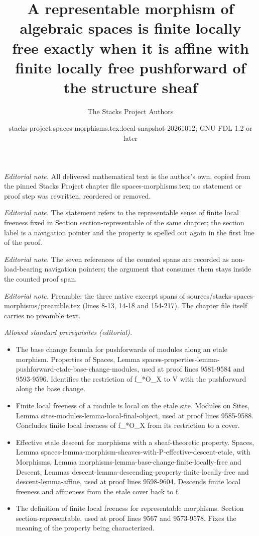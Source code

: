 \documentclass[10pt,a4paper]{amsart}
\title{A representable morphism of algebraic spaces is finite locally free exactly when it is affine with finite locally free pushforward of the structure sheaf}
\author{The Stacks Project Authors}
\date{stacks-project:spaces-morphisms.tex:local-snapshot-20261012; GNU FDL 1.2 or later}
\theoremstyle{plain}
\theoremstyle{definition}
\theoremstyle{remark}
\numberwithin{equation}{subsection}
\begin{document}
\maketitle
\setcounter{subsection}{1}
\noindent\textit{Editorial note.} All delivered mathematical text is the author's own, copied from the pinned Stacks Project chapter file spaces-morphisms.tex; no statement or proof step was rewritten, reordered or removed.\par\medskip
\noindent\textit{Editorial note.} The statement refers to the representable sense of finite local freeness fixed in Section section-representable of the same chapter; the section label is a navigation pointer and the property is spelled out again in the first line of the proof.\par\medskip
\noindent\textit{Editorial note.} The seven references of the counted spans are recorded as non-load-bearing navigation pointers; the argument that consumes them stays inside the counted proof span.\par\medskip
\noindent\textit{Editorial note.} Preamble: the three native excerpt spans of sources/stacks-spaces-morphisms/preamble.tex (lines 8-13, 14-18 and 154-217). The chapter file itself carries no preamble text.\par\medskip
\noindent\textit{Allowed standard prerequisites (editorial).}\begin{itemize}
\item The base change formula for pushforwards of modules along an etale morphism. Properties of Spaces, Lemma spaces-properties-lemma-pushforward-etale-base-change-modules, used at proof lines 9581-9584 and 9593-9596. Identifies the restriction of f\_*O\_X to V with the pushforward along the base change.
\item Finite local freeness of a module is local on the etale site. Modules on Sites, Lemma sites-modules-lemma-local-final-object, used at proof lines 9585-9588. Concludes finite local freeness of f\_*O\_X from its restriction to a cover.
\item Effective etale descent for morphisms with a sheaf-theoretic property. Spaces, Lemma spaces-lemma-morphism-sheaves-with-P-effective-descent-etale, with Morphisms, Lemma morphisms-lemma-base-change-finite-locally-free and Descent, Lemmas descent-lemma-descending-property-finite-locally-free and descent-lemma-affine, used at proof lines 9598-9604. Descends finite local freeness and affineness from the etale cover back to f.
\item The definition of finite local freeness for representable morphisms. Section section-representable, used at proof lines 9567 and 9573-9578. Fixes the meaning of the property being characterized.
\end{itemize}\medskip
\end{document}
